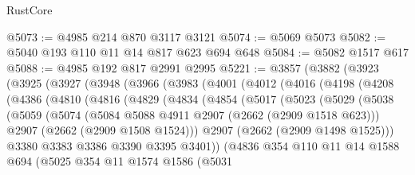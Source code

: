 \begin{lexlean}{RustCore}
\begin{coremodule}
@5073 := @4985 @214 @870 @3117 @3121
@5074 := @5069 @5073
@5082 := @5040 @193 @110 @11 @14 @817 @623 @694 @648
@5084 := @5082 @1517 @617
@5088 := @4985 @192 @817 @2991 @2995
@5221 := @3857
    (@3882
      (@3923
        (@3925
          (@3927
            (@3948
              (@3966
                (@3983
                  (@4001
                    (@4012
                      (@4016
                        (@4198
                          (@4208
                            (@4386
                              (@4810
                                (@4816
                                  (@4829
                                    (@4834
                                      (@4854
                                        (@5017
                                          (@5023
                                            (@5029
                                              (@5038
                                                (@5059
                                                  (@5074
                                                    (@5084
                                                      @5088
                                                      @4911
                                                      @2907
                                                      (@2662 (@2909 @1518 @623)))
                                                    @2907
                                                    (@2662 (@2909 @1508 @1524)))
                                                  @2907
                                                  (@2662 (@2909 @1498 @1525)))
                                                @3380
                                                @3383
                                                @3386
                                                @3390
                                                @3395
                                                @3401))
                                            (@4836
                                              @354
                                              @110
                                              @11
                                              @14
                                              @1588
                                              @694
                                              (@5025
                                                @354
                                                @11
                                                @1574
                                                @1586
                                                (@5031

\end{coremodule}
\end{lexlean}
